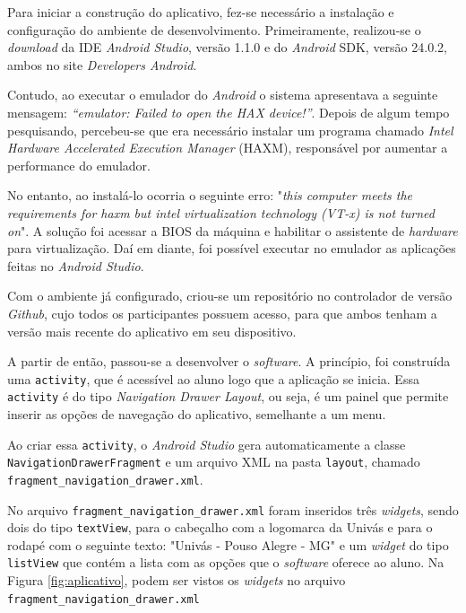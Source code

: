 
	\par Para iniciar a construção do aplicativo, fez-se necessário a instalação e
configuração do ambiente de desenvolvimento. Primeiramente, realizou-se o
\textit{download} da IDE \textit{Android Studio}, versão {1.1.0} e do
\textit{Android} SDK, versão {24.0.2}, ambos no site \textit{Developers
Android}.

	\par Contudo, ao executar o emulador do \textit{Android} o sistema apresentava
a seguinte mensagem: \textit{“emulator: Failed to open the HAX device!”}.
Depois de algum tempo pesquisando, percebeu-se que era necessário instalar um
programa chamado \textit{Intel Hardware Accelerated Execution Manager} (HAXM),
responsável por aumentar a performance do emulador.

	\par No entanto, ao instalá-lo ocorria o seguinte erro: "\textit{this computer
meets the requirements for haxm but intel virtualization technology (VT-x) is
not turned on}". A solução foi acessar a BIOS da máquina e habilitar o
assistente de \textit{hardware} para virtualização. Daí em diante, foi possível
executar no emulador as aplicações feitas no \textit{Android Studio}.

	\par Com o ambiente já configurado, criou-se um repositório no controlador de
versão \textit{Github}, cujo todos os participantes possuem acesso, para que
ambos tenham a versão mais recente do aplicativo em seu dispositivo.

	\par A partir de então, passou-se a desenvolver o \textit{software}. A
princípio, foi construída uma \texttt{activity}, que é acessível ao aluno logo
que a aplicação se inicia. Essa \texttt{activity} é do tipo \textit{Navigation
Drawer Layout}, ou seja, é um painel que permite inserir as opções de navegação
do aplicativo, semelhante a um menu.

	\par Ao criar essa \texttt{activity}, o \textit{Android Studio} gera
automaticamente a classe \texttt{NavigationDrawerFragment} e um arquivo XML na
pasta \texttt{layout}, chamado \texttt{fragment\_navigation\_drawer.xml}.

	\par No arquivo \texttt{fragment\_navigation\_drawer.xml} foram inseridos três
\textit{widgets}, sendo dois do tipo \texttt{textView}, para o cabeçalho com a
logomarca da Univás e para o rodapé com o seguinte texto: "Univás - Pouso
Alegre - MG" e um \textit{widget} do tipo \texttt{listView} que contém a lista
com as opções que o \textit{software} oferece ao aluno. Na Figura
\ref{fig:aplicativo}, podem ser vistos os \textit{widgets} no arquivo
\texttt{fragment\_navigation\_drawer.xml}

